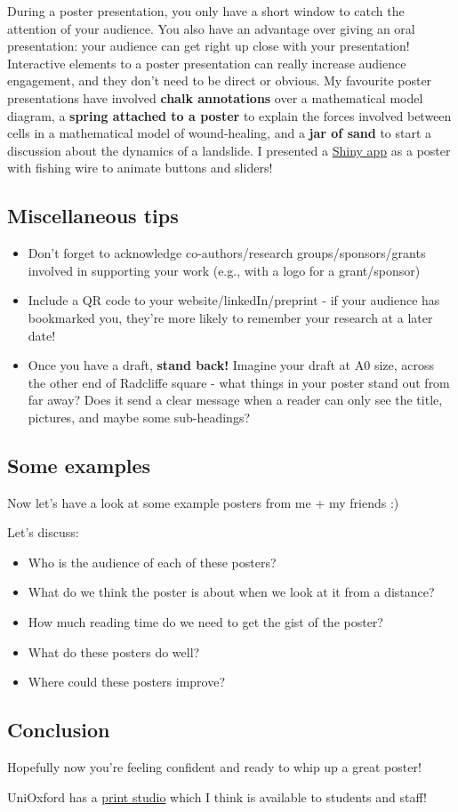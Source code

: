 \documentclass[
]{article}
\providecommand{\tightlist}{%
  \setlength{\itemsep}{0pt}\setlength{\parskip}{0pt}}
\begin{document}
During a poster presentation, you only have a short window to catch the
attention of your audience. You also have an advantage over giving an
oral presentation: your audience can get right up close with your
presentation! Interactive elements to a poster presentation can really
increase audience engagement, and they don't need to be direct or
obvious. My favourite poster presentations have involved \textbf{chalk
annotations} over a mathematical model diagram, a \textbf{spring
attached to a poster} to explain the forces involved between cells in a
mathematical model of wound-healing, and a \textbf{jar of sand} to start
a discussion about the dynamics of a landslide. I presented a
\href{https://lucyharrison.shinyapps.io/pf_drug_resistance_shiny/}{Shiny
app} as a poster with fishing wire to animate buttons and sliders!

\subsection{Miscellaneous tips}\label{miscellaneous-tips}

\begin{itemize}
\item
  Don't forget to acknowledge co-authors/research groups/sponsors/grants
  involved in supporting your work (e.g., with a logo for a
  grant/sponsor)
\item
  Include a QR code to your website/linkedIn/preprint - if your audience
  has bookmarked you, they're more likely to remember your research at a
  later date!
\item
  Once you have a draft, \textbf{stand back!} Imagine your draft at A0
  size, across the other end of Radcliffe square - what things in your
  poster stand out from far away? Does it send a clear message when a
  reader can only see the title, pictures, and maybe some sub-headings?
\end{itemize}

\subsection{Some examples}\label{some-examples}

Now let's have a look at some example posters from me + my friends :)

Let's discuss:

\begin{itemize}
\tightlist
\item
  Who is the audience of each of these posters?
\item
  What do we think the poster is about when we look at it from a
  distance?
\item
  How much reading time do we need to get the gist of the poster?
\item
  What do these posters do well?
\item
  Where could these posters improve?
\end{itemize}

\subsection{Conclusion}\label{conclusion}

Hopefully now you're feeling confident and ready to whip up a great
poster!

UniOxford has a \href{https://estates.admin.ox.ac.uk/print-studio}{print
studio} which I think is available to students and staff!
\end{document}
